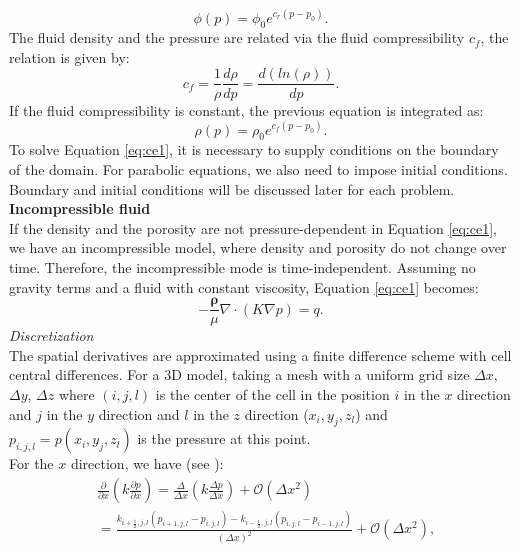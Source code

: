 \documentclass[review]{elsarticle}
\begin{document}
\begin{equation}\label{eq:por}
 \phi(p)=\phi_0 e^{c_r(p-p_0)}.
\end{equation}
The fluid density and the pressure are related via the fluid compressibility $c_f$, the relation is given by:
\begin{equation*}\label{eq:fc}
 c_f=\frac{1}{\rho}\frac{d\rho}{dp}=\frac{d(ln(\rho))}{dp}.
\end{equation*}
If the fluid compressibility is constant, the previous equation is integrated as:
\begin{equation}\label{eq:rhoeq}
 \rho(p)=\rho_0 e^{c_f({p}-{p}_0)}.
\end{equation}
To solve Equation \eqref{eq:ce1}, it is necessary to supply conditions on the boundary of the domain. For parabolic equations, we also need to impose initial conditions. Boundary and initial conditions will be discussed later for each problem.   \\
\textbf{Incompressible fluid}\\
If the density and the porosity are not pressure-dependent in Equation \eqref{eq:ce1}, we have an incompressible model, where density and porosity do not change over time. Therefore, the incompressible mode is time-independent. Assuming no gravity terms and a fluid with constant viscosity, Equation \eqref{eq:ce1} becomes:
\begin{equation}\label{eq:cel}
-\frac{\mathbf{\rho}}{\mu}\nabla \cdot \left({K} \nabla p\right)=q.
\end{equation}
\emph{Discretization}\\
The spatial derivatives are approximated using a finite difference scheme with cell central 
differences. For a 3D model, taking a mesh with a uniform grid size $\Delta x$, $\Delta y$, $\Delta z$ where $(i,j,l)$ is the center 
of the cell
in the position $i$ in the $x$ direction and $j$ in the $y$ direction and $l$ in the $z$ direction
($x_i,y_j,z_l$) and $p_{i,j,l}=p(x_i,y_j,z_l)$ is 
the pressure at this point.
\\ For the $x$ direction, we have (see \cite{Jansen13}):
\begin{align*}
&\frac{\partial}{\partial x}\left(k\frac{\partial p}{\partial x}\right) = 
\frac{\Delta}{\Delta x}\left(k\frac{\Delta p}{\Delta x}\right) +\mathscr{O}(\Delta x^2)\\
&=\frac{ k_{i+\frac{1}{2},j,l}(p_{i+1,j,l}-p_{i,j,l})-k_{i-\frac{1}{2},j,l}(p_{i,j,l}-p_{i-1,j,l})}{\left( \Delta x\right)^2}+\mathscr{O}(\Delta x^2),
\end{align*}
\end{document}
